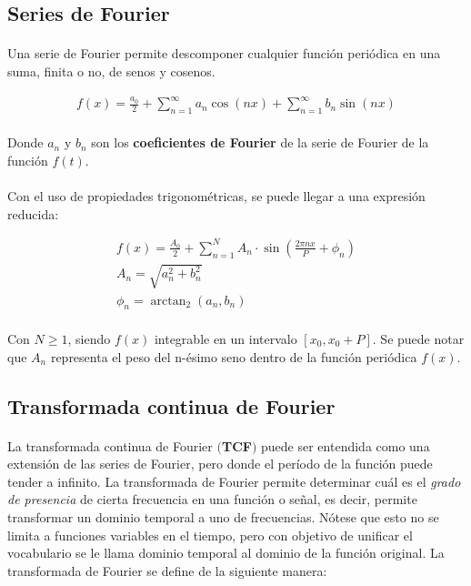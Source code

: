 \documentclass[12pt, twocolumn]{article}
\begin{document}
	\subsection{Series de Fourier}
	
	\paragraph{} Una serie de Fourier permite descomponer cualquier función periódica en una suma, finita o no, de senos y cosenos.
	
	\begin{align}
		f(x) = \frac{a_{0}}{2} + \sum^{\infty}_{n=1}a_{n}\cos(nx) + \sum^{\infty}_{n=1}b_{n}\sin(nx)
	\end{align}
	
	\paragraph{} Donde $a_{n}$ y $b_{n}$ son los \textbf{coeficientes de Fourier} de la serie de Fourier de la función $f(t)$.
	
	\paragraph{} Con el uso de propiedades trigonométricas, se puede llegar a una expresión reducida:
	
	\begin{align}
		f(x) = \frac{A_{0}}{2} + \sum_{n=1}^{N}A_{n}\cdot\sin(\frac{2\pi nx}{P} + \phi_{n}) \\
		A_{n} = \sqrt{a_{n}^{2}+b_{n}^{2}} \\
		\phi_{n} = \arctan_{2}(a_{n},b_{n})
	\end{align}
	
	\paragraph{} Con $N\ge1$, siendo $f(x)$ integrable en un intervalo $\left[x_{0}, x_{0}+P\right]$. Se puede notar que $A_{n}$ representa el peso del n-ésimo seno dentro de la función periódica $f(x)$.
	
	\subsection{Transformada continua de Fourier}
	
	\paragraph{} La transformada continua de Fourier $($\textbf{TCF}$)$ puede ser entendida como una extensión de las series de Fourier, pero donde el período de la función puede tender a infinito. La transformada de Fourier permite determinar cuál es el \textit{grado de presencia} de cierta frecuencia en una función o señal, es decir, permite transformar un dominio temporal a uno de frecuencias. Nótese que esto no se limita a funciones variables en el tiempo, pero con objetivo de unificar el vocabulario se le llama dominio temporal al dominio de la función original. La transformada de Fourier se define de la siguiente manera:
	
\end{document}
